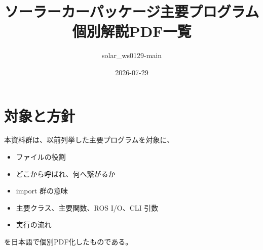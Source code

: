 \documentclass[a4paper,11pt]{article}
\title{ソーラーカーパッケージ主要プログラム\\個別解説PDF一覧}
\author{solar\_ws0129-main}
\date{2026-07-29}
\begin{document}
        \maketitle

        \section*{対象と方針}
        本資料群は、以前列挙した主要プログラムを対象に、
        \begin{itemize}[leftmargin=1.6em]
          \item ファイルの役割
          \item どこから呼ばれ、何へ繋がるか
          \item import 群の意味
          \item 主要クラス、主要関数、ROS I/O、CLI 引数
          \item 実行の流れ
        \end{itemize}
        を日本語で個別PDF化したものである。
\end{document}
